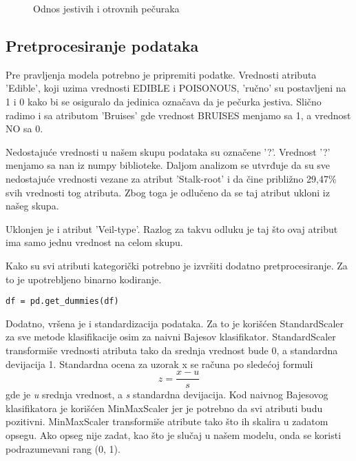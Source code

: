\documentclass[a4paper]{article}
\begin{document}
\begin{figure}[h]
\centering
\label{fig:jestiveOtrovne}
\caption{Odnos jestivih i otrovnih pečuraka}
\end{figure}

\subsection{Pretprocesiranje podataka}
Pre pravljenja modela potrebno je pripremiti podatke. Vrednosti atributa 'Edible', koji uzima vrednosti EDIBLE i POISONOUS, 'ručno' su postavljeni na 1 i 0 kako bi se osiguralo da jedinica označava da je pečurka jestiva. Slično radimo i sa atributom 'Bruises' gde vrednost BRUISES menjamo sa 1, a vrednost NO sa 0.

Nedostajuće vrednosti u našem skupu podataka su označene '?'. Vrednost '?' menjamo sa nan iz numpy biblioteke. Daljom analizom se utvrđuje da su sve nedostajuće vrednosti vezane za atribut 'Stalk-root' i da čine približno 29,47\% svih vrednosti tog atributa. Zbog toga je odlučeno da se taj atribut ukloni iz našeg skupa. 

Uklonjen je i atribut 'Veil-type'. Razlog za takvu odluku je taj što ovaj atribut ima samo jednu vrednost na celom skupu.

Kako su svi atributi kategorički potrebno je izvršiti dodatno pretprocesiranje. Za to je upotrebljeno binarno kodiranje.\begin{lstlisting}[caption={Binarno kodiranje},frame=single, label=simple]
df = pd.get_dummies(df)
\end{lstlisting}

Dodatno, vršena je i standardizacija podataka. Za to je korišćen StandardScaler za sve metode klasifikacije osim za naivni Bajesov klasifikator. StandardScaler transformiše vrednosti atributa tako da srednja vrednost bude 0, a standardna devijacija 1. Standardna ocena za uzorak x se računa po sledećoj formuli
\begin{equation}
    z = \frac{x - u}{s}
\end{equation}
gde je \textit{u} srednja vrednost, a \textit{s} standardna devijacija\cite{sklearn}. 
Kod naivnog Bajesovog klasifikatora je korišćen MinMaxScaler jer je potrebno da svi atributi budu pozitivni. MinMaxScaler transformiše atribute tako što ih skalira u zadatom opsegu. Ako opseg nije zadat, kao što je slučaj u našem modelu, onda se koristi podrazumevani rang (0, 1)\cite{sklearn}.
\end{document}
